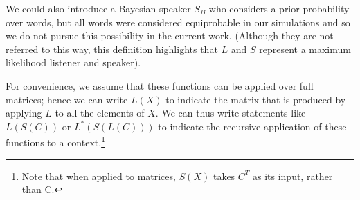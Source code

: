 We could also introduce a Bayesian speaker $S_B$ who considers a prior probability over words, but all words were considered equiprobable in our simulations and so we do not pursue this possibility in the current work. (Although they are not referred to this way, this definition highlights that $L$ and $S$ represent a maximum likelihood listener and speaker). 

For convenience, we assume that these functions can be applied over full matrices; hence we can write $L(X)$ to indicate the matrix that is produced by applying $L$ to all the elements of $X$. We can thus write statements like $L(S(C))$ or $L^*(S(L(C)))$ to indicate the recursive application of these functions to a context.\footnote{Note that when applied to matrices, $S(X)$ takes $C^T$ as its input, rather than C.}




